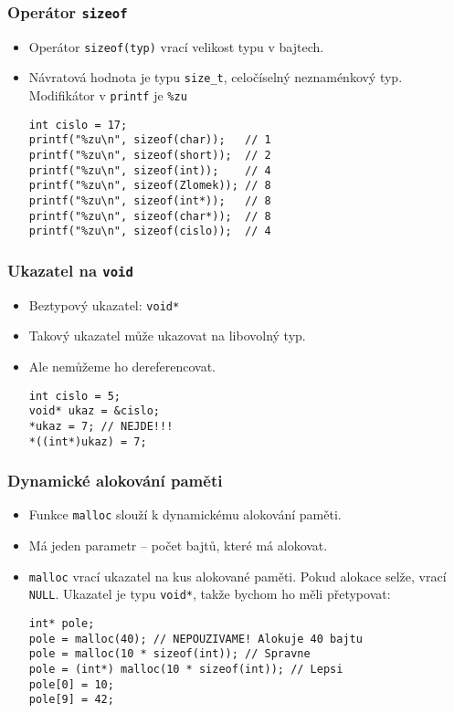 \documentclass{beamer}
\newenvironment{itemizex}%
  {\large \begin{itemize}%
    \setlength{\itemsep}{8pt}%
    \setlength{\parskip}{8pt}}%
  {\end{itemize}}
\begin{document}


\begin{frame}[t,fragile]\frametitle{Operátor \texttt{sizeof}} 
    \begin{itemizex}
        \item Operátor \texttt{sizeof(typ)} vrací velikost typu v bajtech.
        \item Návratová hodnota je typu \texttt{size\_t}, celočíselný neznaménkový typ. Modifikátor v \texttt{printf} je \texttt{\%zu}
        \begin{verbatim} 
int cislo = 17;
printf("%zu\n", sizeof(char));   // 1
printf("%zu\n", sizeof(short));  // 2
printf("%zu\n", sizeof(int));    // 4
printf("%zu\n", sizeof(Zlomek)); // 8
printf("%zu\n", sizeof(int*));   // 8
printf("%zu\n", sizeof(char*));  // 8
printf("%zu\n", sizeof(cislo));  // 4
        \end{verbatim}
    \end{itemizex}
\end{frame}


\begin{frame}[t,fragile]\frametitle{Ukazatel na \texttt{void}} 
    \begin{itemizex}
        \item Beztypový ukazatel: \texttt{void*}
        \item Takový ukazatel může ukazovat na libovolný typ.
        \item Ale nemůžeme ho dereferencovat. 
        \begin{verbatim} 
int cislo = 5;
void* ukaz = &cislo;
*ukaz = 7; // NEJDE!!!
*((int*)ukaz) = 7;
        \end{verbatim}
    \end{itemizex}
\end{frame}


\begin{frame}[t,fragile]\frametitle{Dynamické alokování paměti} 
    \begin{itemizex}
        \item Funkce \texttt{malloc} slouží k dynamickému alokování paměti.
        \item Má jeden parametr -- počet bajtů, které má alokovat.
        \item \texttt{malloc} vrací ukazatel na kus alokované paměti. Pokud alokace selže, vrací \texttt{NULL}. Ukazatel je typu \texttt{void*}, takže bychom ho měli přetypovat:
            \begin{verbatim} 
int* pole;
pole = malloc(40); // NEPOUZIVAME! Alokuje 40 bajtu
pole = malloc(10 * sizeof(int)); // Spravne
pole = (int*) malloc(10 * sizeof(int)); // Lepsi
pole[0] = 10;
pole[9] = 42;
            \end{verbatim}
    \end{itemizex}
\end{frame}
\end{document}
